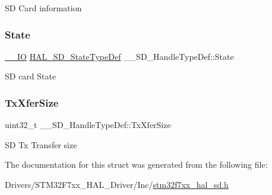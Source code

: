 SD Card information \mbox{\label{struct_____s_d___handle_type_def_ababf20731e895a6374d13d967aabfb80}} 
\subsubsection{\texorpdfstring{State}{State}}
{\footnotesize\ttfamily \mbox{\hyperlink{core__sc300_8h_aec43007d9998a0a0e01faede4133d6be}{\+\_\+\+\_\+\+IO}} \mbox{\hyperlink{group___s_d___exported___types___group1_ga0012126bcdfea270fe367bfaec2692ba}{H\+A\+L\+\_\+\+S\+D\+\_\+\+State\+Type\+Def}} \+\_\+\+\_\+\+S\+D\+\_\+\+Handle\+Type\+Def\+::\+State}

SD card State \mbox{\label{struct_____s_d___handle_type_def_a9440fde045121f2f0399b4d69b27a399}} 
\subsubsection{\texorpdfstring{TxXferSize}{TxXferSize}}
{\footnotesize\ttfamily uint32\+\_\+t \+\_\+\+\_\+\+S\+D\+\_\+\+Handle\+Type\+Def\+::\+Tx\+Xfer\+Size}

SD Tx Transfer size 

The documentation for this struct was generated from the following file\+:\begin{DoxyCompactItemize}
\item 
Drivers/\+S\+T\+M32\+F7xx\+\_\+\+H\+A\+L\+\_\+\+Driver/\+Inc/\mbox{\hyperlink{stm32f7xx__hal__sd_8h}{stm32f7xx\+\_\+hal\+\_\+sd.\+h}}\end{DoxyCompactItemize}
